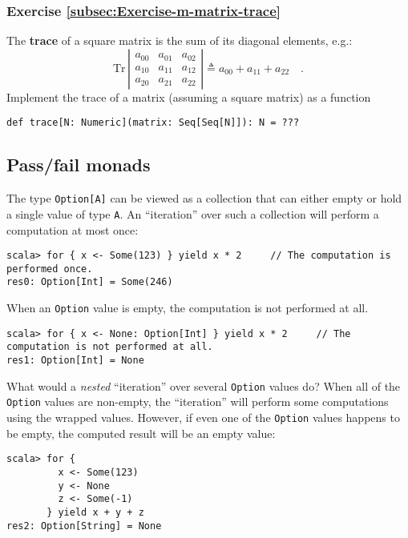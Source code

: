 \subsubsection{Exercise \label{subsec:Exercise-m-matrix-trace}\ref{subsec:Exercise-m-matrix-trace}}

The \textbf{trace} of a square matrix is
the sum of its diagonal elements, e.g.:
\[
\text{Tr}\,\left|\begin{array}{ccc}
a_{00} & a_{01} & a_{02}\\
a_{10} & a_{11} & a_{12}\\
a_{20} & a_{21} & a_{22}
\end{array}\right|\triangleq a_{00}+a_{11}+a_{22}\quad.
\]
Implement the trace of a matrix (assuming a square matrix) as a function
\begin{lstlisting}
def trace[N: Numeric](matrix: Seq[Seq[N]]): N = ???
\end{lstlisting}


\subsection{Pass/fail monads}

The type \lstinline!Option[A]! can be viewed as a collection that
can either empty or hold a single value of type \lstinline!A!. An
\textsf{``}iteration\textsf{''} over such a collection will perform a computation
at most once:
\begin{lstlisting}
scala> for { x <- Some(123) } yield x * 2     // The computation is performed once.
res0: Option[Int] = Some(246) 
\end{lstlisting}
When an \lstinline!Option! value is empty, the computation is not
performed at all.
\begin{lstlisting}
scala> for { x <- None: Option[Int] } yield x * 2     // The computation is not performed at all.
res1: Option[Int] = None
\end{lstlisting}
What would a \emph{nested} \textsf{``}iteration\textsf{''} over several \lstinline!Option!
values do? When all of the \lstinline!Option! values are non-empty,
the \textsf{``}iteration\textsf{''} will perform some computations using the wrapped
values. However, if even one of the \lstinline!Option! values happens
to be empty, the computed result will be an empty value:
\begin{lstlisting}
scala> for {
         x <- Some(123)
         y <- None
         z <- Some(-1)
       } yield x + y + z
res2: Option[String] = None
\end{lstlisting}


